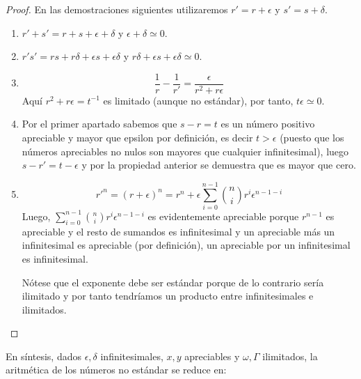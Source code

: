 \documentclass[11pt,oneside,a4paper]{book}
\begin{document}
\begin{proof}
En las demostraciones siguientes utilizaremos $r'=r+\epsilon$ y $s'=s+\delta$.
\begin{enumerate}[$a$)]
\item $r'+s'=r+s+\epsilon+\delta$ y $\epsilon+\delta\simeq 0$.
\item $r's'=rs+r\delta+\epsilon s+\epsilon\delta$ y $r\delta+\epsilon s+\epsilon\delta\simeq 0$.
\item $$\frac{1}{r}-\frac{1}{r'}=\frac{\epsilon}{r^2+r\epsilon}$$
Aquí $r^2+r\epsilon=t^{-1}$ es limitado (aunque no estándar), por tanto, $t\epsilon\simeq 0$.
\item Por el primer apartado sabemos que $s-r=t$ es un número positivo apreciable y mayor que epsilon por definición, es decir $t\gt\epsilon$ (puesto que los números apreciables no nulos son mayores que cualquier infinitesimal), luego $s-r'=t-\epsilon$ y por la propiedad anterior se demuestra que es mayor que cero.
\item $$r'^n=(r+\epsilon)^n=r^n+\epsilon\sum_{i=0}^{n-1}\binom{n}{i}r^i\epsilon^{n-1-i}$$
Luego, $\sum_{i=0}^{n-1}\binom{n}{i}r^i\epsilon^{n-1-i}$ es evidentemente apreciable porque $r^{n-1}$ es apreciable y el resto de sumandos es infinitesimal y un apreciable más un infinitesimal es apreciable (por definición), un apreciable por un infinitesimal es infinitesimal.

Nótese que el exponente debe ser estándar porque de lo contrario sería ilimitado y por tanto tendríamos un producto entre infinitesimales e ilimitados.
\end{enumerate}
\end{proof}
En síntesis, dados $\epsilon,\delta$ infinitesimales, $x,y$ apreciables y $\omega,\Gamma$ ilimitados, la aritmética de los números no estándar se reduce en:
\end{document}

